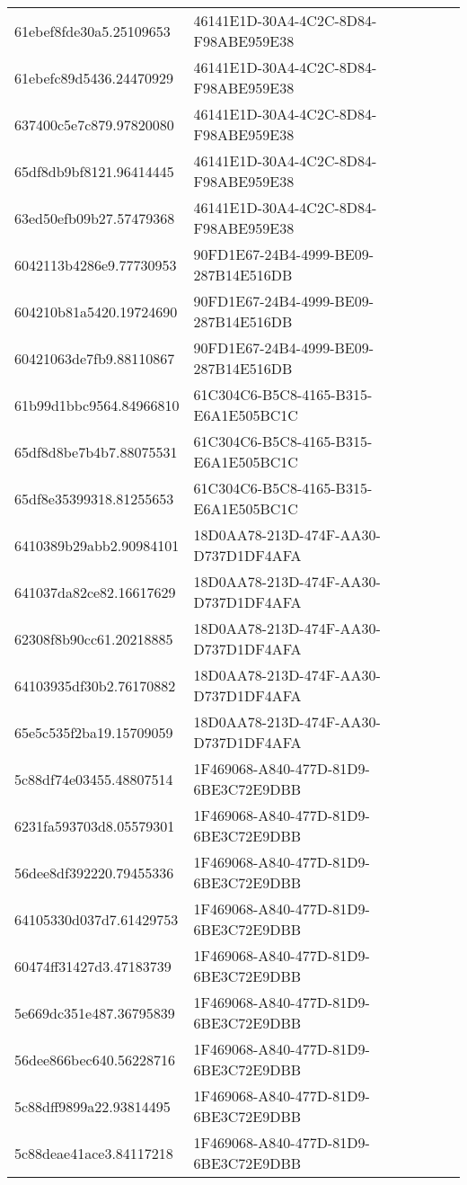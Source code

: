 \begin{tabular}{ll}
61ebef8fde30a5.25109653 & 46141E1D-30A4-4C2C-8D84-F98ABE959E38 \\
61ebefc89d5436.24470929 & 46141E1D-30A4-4C2C-8D84-F98ABE959E38 \\
637400c5e7c879.97820080 & 46141E1D-30A4-4C2C-8D84-F98ABE959E38 \\
65df8db9bf8121.96414445 & 46141E1D-30A4-4C2C-8D84-F98ABE959E38 \\
63ed50efb09b27.57479368 & 46141E1D-30A4-4C2C-8D84-F98ABE959E38 \\
6042113b4286e9.77730953 & 90FD1E67-24B4-4999-BE09-287B14E516DB \\
604210b81a5420.19724690 & 90FD1E67-24B4-4999-BE09-287B14E516DB \\
60421063de7fb9.88110867 & 90FD1E67-24B4-4999-BE09-287B14E516DB \\
61b99d1bbc9564.84966810 & 61C304C6-B5C8-4165-B315-E6A1E505BC1C \\
65df8d8be7b4b7.88075531 & 61C304C6-B5C8-4165-B315-E6A1E505BC1C \\
65df8e35399318.81255653 & 61C304C6-B5C8-4165-B315-E6A1E505BC1C \\
6410389b29abb2.90984101 & 18D0AA78-213D-474F-AA30-D737D1DF4AFA \\
641037da82ce82.16617629 & 18D0AA78-213D-474F-AA30-D737D1DF4AFA \\
62308f8b90cc61.20218885 & 18D0AA78-213D-474F-AA30-D737D1DF4AFA \\
64103935df30b2.76170882 & 18D0AA78-213D-474F-AA30-D737D1DF4AFA \\
65e5c535f2ba19.15709059 & 18D0AA78-213D-474F-AA30-D737D1DF4AFA \\
5c88df74e03455.48807514 & 1F469068-A840-477D-81D9-6BE3C72E9DBB \\
6231fa593703d8.05579301 & 1F469068-A840-477D-81D9-6BE3C72E9DBB \\
56dee8df392220.79455336 & 1F469068-A840-477D-81D9-6BE3C72E9DBB \\
64105330d037d7.61429753 & 1F469068-A840-477D-81D9-6BE3C72E9DBB \\
60474ff31427d3.47183739 & 1F469068-A840-477D-81D9-6BE3C72E9DBB \\
5e669dc351e487.36795839 & 1F469068-A840-477D-81D9-6BE3C72E9DBB \\
56dee866bec640.56228716 & 1F469068-A840-477D-81D9-6BE3C72E9DBB \\
5c88dff9899a22.93814495 & 1F469068-A840-477D-81D9-6BE3C72E9DBB \\
5c88deae41ace3.84117218 & 1F469068-A840-477D-81D9-6BE3C72E9DBB \\

\end{tabular}
